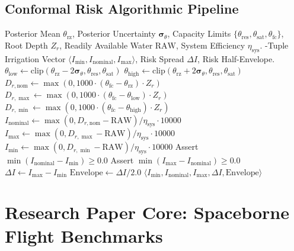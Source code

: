 \documentclass[11pt,a4paper]{article}
\theoremstyle{definition}
\theoremstyle{remark}
\begin{document}
\subsection{Conformal Risk Algorithmic Pipeline}
\begin{algorithm}[H]
\caption{Conformal 2-$\sigma$ Risk Dispatch Implementation}
\label{alg:conformal_risk}
\begin{algorithmic}[1]
\Require Posterior Mean $\theta_{\text{rz}}$, Posterior Uncertainty $\boldsymbol{\sigma}_{\theta}$, Capacity Limits $\{\theta_{\text{res}}, \theta_{\text{sat}}, \theta_{\text{fc}}\}$, Root Depth $Z_r$, Readily Available Water $\text{RAW}$, System Efficiency $\eta_{\text{sys}}$.
-Tuple Irrigation Vector $\langle I_{\min}, I_{\text{nominal}}, I_{\max} \rangle$, Risk Spread $\Delta I$, Risk Half-Envelope.
\State $\theta_{\text{low}} \leftarrow \text{clip}(\theta_{\text{rz}} - 2\boldsymbol{\sigma}_{\theta}, \theta_{\text{res}}, \theta_{\text{sat}})$
\State $\theta_{\text{high}} \leftarrow \text{clip}(\theta_{\text{rz}} + 2\boldsymbol{\sigma}_{\theta}, \theta_{\text{res}}, \theta_{\text{sat}})$
\State $D_{r,\text{nom}} \leftarrow \max(0, 1000 \cdot (\theta_{\text{fc}} - \theta_{\text{rz}}) \cdot Z_r)$
\State $D_{r,\max} \leftarrow \max(0, 1000 \cdot (\theta_{\text{fc}} - \theta_{\text{low}}) \cdot Z_r)$
\State $D_{r,\min} \leftarrow \max(0, 1000 \cdot (\theta_{\text{fc}} - \theta_{\text{high}}) \cdot Z_r)$
\State $I_{\text{nominal}} \leftarrow \max(0, D_{r,\text{nom}} - \text{RAW}) / \eta_{\text{sys}} \cdot 10000$
\State $I_{\max} \leftarrow \max(0, D_{r,\max} - \text{RAW}) / \eta_{\text{sys}} \cdot 10000$
\State $I_{\min} \leftarrow \max(0, D_{r,\min} - \text{RAW}) / \eta_{\text{sys}} \cdot 10000$
\State Assert $\min(I_{\text{nominal}} - I_{\min}) \ge 0.0$
\State Assert $\min(I_{\max} - I_{\text{nominal}}) \ge 0.0$
\State $\Delta I \leftarrow I_{\max} - I_{\min}$
\State $\text{Envelope} \leftarrow \Delta I / 2.0$
\State \Return $\langle I_{\min}, I_{\text{nominal}}, I_{\max}, \Delta I, \text{Envelope} \rangle$
\end{algorithmic}
\end{algorithm}


\section{Research Paper Core: Spaceborne Flight Benchmarks}
\end{document}
